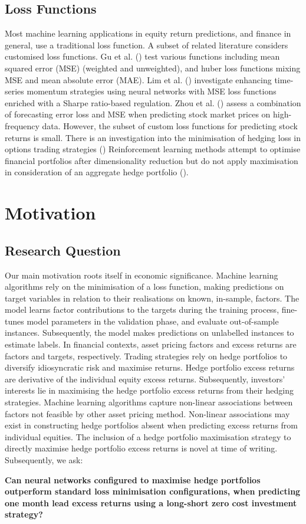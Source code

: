 \documentclass[12pt]{article}
\begin{document}
\subsection{Loss Functions}
Most machine learning applications in equity return predictions, and finance in general, use a traditional loss function.
A subset of related literature considers customised loss functions.
Gu et al. (\citeyear{eapvml}) test various functions including mean squared error (MSE) (weighted and unweighted), and huber loss functions mixing MSE and mean absolute error (MAE).
Lim et al. (\citeyear{lim2019enhancing}) investigate enhancing time-series momentum strategies using neural networks with MSE loss functions enriched with a Sharpe ratio-based regulation.
Zhou et al. (\citeyear{zhou2018stock}) assess a combination of forecasting error loss and MSE when predicting stock market prices on high-frequency data.
However, the subset of custom loss functions for predicting stock returns is small.
There is an investigation into the minimisation of hedging loss in options trading strategies (\cite{ruf2021hedging})
Reinforcement learning methods attempt to optimise financial portfolios after dimensionality reduction but do not apply maximisation in consideration of an aggregate hedge portfolio (\cite{soleymani2020financial}).
\section{Motivation}\label{motivations}
\subsection{Research Question}
Our main motivation roots itself in economic significance.
Machine learning algorithms rely on the minimisation of a loss function, making predictions on target variables in relation to their realisations on known, in-sample, factors.
The model learns factor contributions to the targets during the training process, fine-tunes model parameters in the validation phase, and evaluate out-of-sample instances.
Subsequently, the model makes predictions on unlabelled instances to estimate labels.
In financial contexts, asset pricing factors and excess returns are factors and targets, respectively.
Trading strategies rely on hedge portfolios to diversify idiosyncratic risk and maximise returns.
Hedge portfolio excess returns are derivative of the individual equity excess returns.
Subsequently, investors' interests lie in maximising the hedge portfolio excess returns from their hedging strategies.
Machine learning algorithms capture non-linear associations between factors not feasible by other asset pricing method.
Non-linear associations may exist in constructing hedge portfolios absent when predicting excess returns from individual equities.
The inclusion of a hedge portfolio maximisation strategy to directly maximise hedge portfolio excess returns is novel at time of writing.
Subsequently, we ask:
\begin{center}
	\textbf{Can neural networks configured to maximise hedge portfolios outperform standard loss minimisation configurations,
		when predicting one month lead excess returns using a long-short zero cost investment strategy?}
\end{center}
\end{document}

